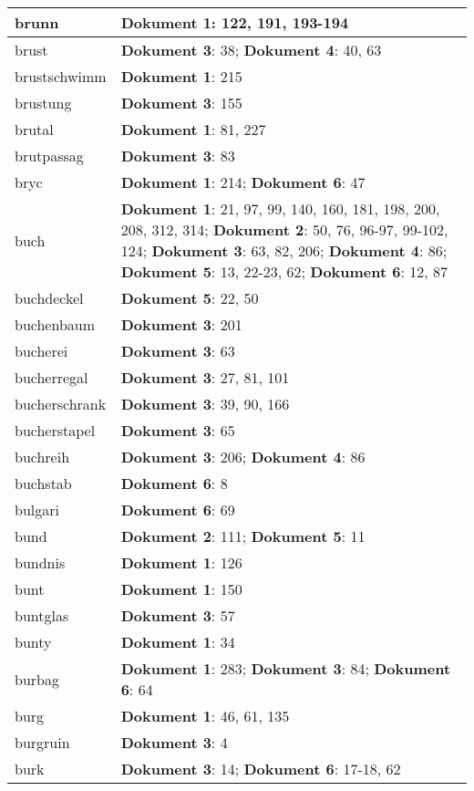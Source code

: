 \documentclass[a5paper]{article}
\begin{document}
\begin{longtable}[l]{|l|p{3in}|}
\hline
brunn & \textbf{Dokument 1}: 122, 191, 193-194 \\
\hline
brust & \textbf{Dokument 3}: 38; \textbf{Dokument 4}: 40, 63 \\
\hline
brustschwimm & \textbf{Dokument 1}: 215 \\
\hline
brustung & \textbf{Dokument 3}: 155 \\
\hline
brutal & \textbf{Dokument 1}: 81, 227 \\
\hline
brutpassag & \textbf{Dokument 3}: 83 \\
\hline
bryc & \textbf{Dokument 1}: 214; \textbf{Dokument 6}: 47 \\
\hline
buch & \textbf{Dokument 1}: 21, 97, 99, 140, 160, 181, 198, 200, 208, 312, 314; \textbf{Dokument 2}: 50, 76, 96-97, 99-102, 124; \textbf{Dokument 3}: 63, 82, 206; \textbf{Dokument 4}: 86; \textbf{Dokument 5}: 13, 22-23, 62; \textbf{Dokument 6}: 12, 87 \\
\hline
buchdeckel & \textbf{Dokument 5}: 22, 50 \\
\hline
buchenbaum & \textbf{Dokument 3}: 201 \\
\hline
bucherei & \textbf{Dokument 3}: 63 \\
\hline
bucherregal & \textbf{Dokument 3}: 27, 81, 101 \\
\hline
bucherschrank & \textbf{Dokument 3}: 39, 90, 166 \\
\hline
bucherstapel & \textbf{Dokument 3}: 65 \\
\hline
buchreih & \textbf{Dokument 3}: 206; \textbf{Dokument 4}: 86 \\
\hline
buchstab & \textbf{Dokument 6}: 8 \\
\hline
bulgari & \textbf{Dokument 6}: 69 \\
\hline
bund & \textbf{Dokument 2}: 111; \textbf{Dokument 5}: 11 \\
\hline
bundnis & \textbf{Dokument 1}: 126 \\
\hline
bunt & \textbf{Dokument 1}: 150 \\
\hline
buntglas & \textbf{Dokument 3}: 57 \\
\hline
bunty & \textbf{Dokument 1}: 34 \\
\hline
burbag & \textbf{Dokument 1}: 283; \textbf{Dokument 3}: 84; \textbf{Dokument 6}: 64 \\
\hline
burg & \textbf{Dokument 1}: 46, 61, 135 \\
\hline
burgruin & \textbf{Dokument 3}: 4 \\
\hline
burk & \textbf{Dokument 3}: 14; \textbf{Dokument 6}: 17-18, 62 \\

\end{longtable}
\end{document}
